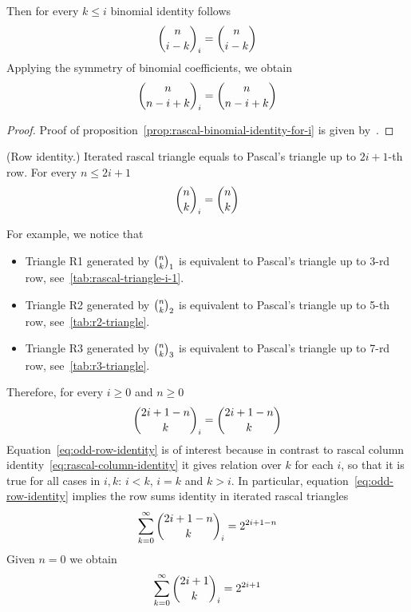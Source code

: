 Then for every $k \leq i$ binomial identity follows
\begin{align*}
    \binom{n}{i-k}_{i} = \binom{n}{i-k}
\end{align*}
Applying the symmetry of binomial coefficients, we obtain
\begin{align*}
    \binom{n}{n-i+k}_{i} = \binom{n}{n-i+k}
\end{align*}
\begin{proof}
    Proof of proposition~\eqref{prop:rascal-binomial-identity-for-i}
    is given by~\cite[proposition 6.0.1]{gregory2023iterated}.
\end{proof}
\begin{proposition}
    \label{prop:odd-row-proposition}
    (Row identity.)
    Iterated rascal triangle equals to Pascal's triangle up to $2i+1$-th row.
    For every $n \leq 2i+1$
    \begin{align*}
        \binom{n}{k}_{i} = \binom{n}{k}
    \end{align*}
\end{proposition}
For example, we notice that
\begin{itemize}
    \item Triangle R1 generated by $\binom{n}{k}_{1}$ is equivalent to Pascal's triangle up to 3-rd row, see~\eqref{tab:rascal-triangle-i-1}.
    \item Triangle R2 generated by $\binom{n}{k}_{2}$ is equivalent to Pascal's triangle up to 5-th row, see~\eqref{tab:r2-triangle}.
    \item Triangle R3 generated by $\binom{n}{k}_{3}$ is equivalent to Pascal's triangle up to 7-rd row, see~\eqref{tab:r3-triangle}.
\end{itemize}
Therefore, for every $i \geq 0$ and $n \geq 0$
\begin{equation}
    \binom{2i+1-n}{k}_{i} = \binom{2i+1-n}{k}
    \label{eq:odd-row-identity}
\end{equation}
Equation~\eqref{eq:odd-row-identity} is of interest because in contrast to rascal
column identity~\eqref{eq:rascal-column-identity} it gives relation over $k$ for each $i$,
so that it is true for all cases in $i,k$: $i < k$, $i=k$ and $k >i$.
In particular, equation~\eqref{eq:odd-row-identity} implies the row sums identity in iterated rascal triangles
\begin{align*}
    \sum_{k=0}^{\infty} \binom{2i+1-n}{k}_{i} = 2^{2i+1-n}
\end{align*}
Given $n=0$ we obtain
\begin{align*}
    \sum_{k=0}^{\infty} \binom{2i+1}{k}_{i} = 2^{2i+1}
\end{align*}
